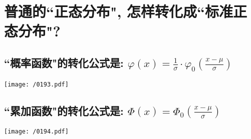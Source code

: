 \documentclass[UTF8]{ctexart}
\begin{document}
\section{普通的``正态分布", 怎样转化成``标准正态分布"?}

\subsection{``概率函数"的转化公式是: $\boxed{
	\varphi (x)=\frac{1}{\sigma}\cdot \varphi _0(\frac{x-\mu}{\sigma})
	}$}

\texttt{[image: /0193.pdf]} \\




\subsection{``累加函数"的转化公式是: $\boxed{\varPhi (x)=\varPhi _0(\frac{x-\mu}{\sigma})	}$}

\texttt{[image: /0194.pdf]} \\
\end{document}
